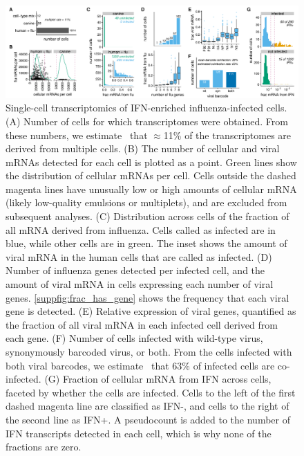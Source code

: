 \documentclass[]{asm-article}
\newcommand{\SUPPFIG}[1]{\autoref{suppfig:#1}}
\begin{document}
\begin{figure}
\begin{fullwidth}

\includegraphics[width=\linewidth, clip=false]{figures/single_cell_figures/p_cell_summary.pdf}

\caption{
Single-cell transcriptomics of IFN-enriched influenza-infected cells.
(A) 
Number of cells for which transcriptomes were obtained.
From these numbers, we estimate~\cite{bloom2018estimating} that $\approx$11\% of the transcriptomes are derived from multiple cells. 
(B) The number of cellular and viral mRNAs detected for each cell is plotted as a point.
Green lines show the distribution of cellular mRNAs per cell.
Cells outside the dashed magenta lines have unusually low or high amounts of cellular mRNA (likely low-quality emulsions or multiplets), and are excluded from subsequent analyses.
(C) Distribution across cells of the fraction of all mRNA derived from influenza.
Cells called as infected are in blue, while other cells are in green.
The inset shows the amount of viral mRNA in the human cells that are called as infected.
(D) Number of influenza genes detected per infected cell, and the amount of viral mRNA in cells expressing each number of viral genes.
\SUPPFIG{frac_has_gene} shows the frequency that each viral gene is detected.
(E) Relative expression of viral genes, quantified as the fraction of all viral mRNA in each infected cell derived from each gene.
(F) Number of cells infected with wild-type virus, synonymously barcoded virus, or both.
From the cells infected with both viral barcodes, we estimate~\cite{bloom2018estimating} that 63\% of infected cells are co-infected.
(G) Fraction of cellular mRNA from IFN across cells, faceted by whether the cells are infected.
Cells to the left of the first dashed magenta line are classified as IFN-, and cells to the right of the second line as IFN+.
A pseudocount is added to the number of IFN transcripts detected in each cell, which is why none of the fractions are zero.
}
\label{fig:transcriptomics}

\end{fullwidth}
\end{figure}
\end{document}
